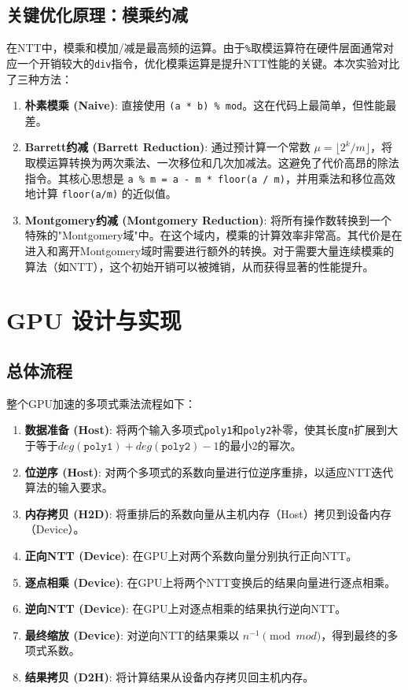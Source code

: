\documentclass[a4paper]{article}
\begin{document}
\subsection{关键优化原理：模乘约减}
在NTT中，模乘和模加/减是最高频的运算。由于\texttt{\%}取模运算符在硬件层面通常对应一个开销较大的\texttt{div}指令，优化模乘运算是提升NTT性能的关键。本次实验对比了三种方法：
\begin{enumerate}
    \item \textbf{朴素模乘 (Naive)}: 直接使用 \texttt{(a * b) \% mod}。这在代码上最简单，但性能最差。
    \item \textbf{Barrett约减 (Barrett Reduction)}: 通过预计算一个常数 \(\mu = \lfloor 2^k / m \rfloor\)，将取模运算转换为两次乘法、一次移位和几次加减法。这避免了代价高昂的除法指令。其核心思想是 \texttt{a \% m = a - m * floor(a / m)}，并用乘法和移位高效地计算 \texttt{floor(a/m)} 的近似值。
    \item \textbf{Montgomery约减 (Montgomery Reduction)}: 将所有操作数转换到一个特殊的"Montgomery域"中。在这个域内，模乘的计算效率非常高。其代价是在进入和离开Montgomery域时需要进行额外的转换。对于需要大量连续模乘的算法（如NTT），这个初始开销可以被摊销，从而获得显著的性能提升。
\end{enumerate}

\section{GPU 设计与实现}
\subsection{总体流程}
整个GPU加速的多项式乘法流程如下：
\begin{enumerate}
    \item \textbf{数据准备 (Host)}: 将两个输入多项式\texttt{poly1}和\texttt{poly2}补零，使其长度\texttt{n}扩展到大于等于$deg(\texttt{poly1}) + deg(\texttt{poly2}) - 1$的最小2的幂次。
    \item \textbf{位逆序 (Host)}: 对两个多项式的系数向量进行位逆序重排，以适应NTT迭代算法的输入要求。
    \item \textbf{内存拷贝 (H2D)}: 将重排后的系数向量从主机内存（Host）拷贝到设备内存（Device）。
    \item \textbf{正向NTT (Device)}: 在GPU上对两个系数向量分别执行正向NTT。
    \item \textbf{逐点相乘 (Device)}: 在GPU上将两个NTT变换后的结果向量进行逐点相乘。
    \item \textbf{逆向NTT (Device)}: 在GPU上对逐点相乘的结果执行逆向NTT。
    \item \textbf{最终缩放 (Device)}: 对逆向NTT的结果乘以 \(n^{-1} \pmod{mod}\)，得到最终的多项式系数。
    \item \textbf{结果拷贝 (D2H)}: 将计算结果从设备内存拷贝回主机内存。
\end{enumerate}
\end{document}
